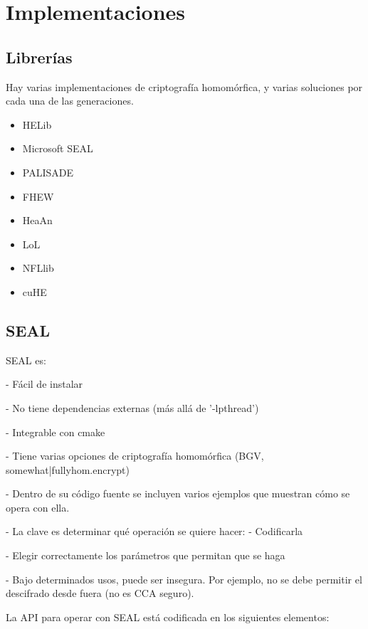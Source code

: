 \chapter{Implementaciones}
\label{chap:libs}

\section{Librerías}

Hay varias implementaciones de criptografía homomórfica, y varias soluciones por cada una de las generaciones.

\begin{itemize}
    \item HELib
    \item Microsoft SEAL
    \item PALISADE
    \item FHEW
    \item HeaAn
    \item LoL
    \item NFLlib
    \item cuHE
\end{itemize}{}

\section{SEAL}

SEAL es:

- Fácil de instalar

- No tiene dependencias externas (más allá de '-lpthread')

- Integrable con cmake

- Tiene varias opciones de criptografía homomórfica (BGV, {somewhat|fully}hom.encrypt)

- Dentro de su código fuente se incluyen varios ejemplos que muestran cómo se opera con ella.

- La clave es determinar qué operación se quiere hacer:
    - Codificarla

    - Elegir correctamente los parámetros que permitan que se haga

- Bajo determinados usos, puede ser insegura. Por ejemplo, no se debe permitir el descifrado desde fuera \cite{peng_danger_2019} (no es CCA seguro).


La API para operar con SEAL está codificada en los siguientes elementos:

